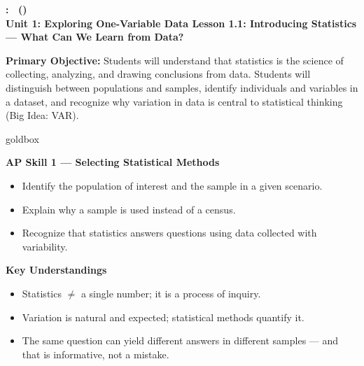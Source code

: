\documentclass[10pt]{article}
\begin{document}
\def\UnitNumberName{Unit 1: Exploring One-Variable Data \quad}
\def\LessonNumberName{Lesson 1.1: Introducing Statistics --- What Can We Learn from Data?}

\begin{center}
    {\Large\bfseries \CourseName: \SchoolYear\ (\MeetingLength) \\
    {\small\bfseries \UnitNumberName \LessonNumberName}}
\end{center}

\begin{tcolorbox}[colback=sky, colframe=navy, boxrule=0.9pt, arc=2mm,
    left=2mm, right=2mm, top=1.5mm, bottom=1.5mm]
    \textbf{Primary Objective:} Students will understand that statistics is the science of
    collecting, analyzing, and drawing conclusions from data. Students will distinguish between
    populations and samples, identify individuals and variables in a dataset, and recognize why
    variation in data is central to statistical thinking (Big Idea: VAR).
\end{tcolorbox}

\renewcommand{\arraystretch}{1.6}
\begin{skillbox}{goldbox}
\begin{minipage}[t]{0.48\linewidth}
    \textbf{AP Skill 1 --- Selecting Statistical Methods}
    \begin{itemize}
        \item Identify the population of interest and the sample in a given scenario.
        \item Explain why a sample is used instead of a census.
        \item Recognize that statistics answers questions using data collected with variability.
    \end{itemize}
\end{minipage}
\hfill
\begin{minipage}[t]{0.48\linewidth}
    \textbf{Key Understandings}
    \begin{itemize}
        \item Statistics $\neq$ a single number; it is a process of inquiry.
        \item Variation is natural and expected; statistical methods quantify it.
        \item The same question can yield different answers in different samples --- and that is informative, not a mistake.
    \end{itemize}
\end{minipage}
\end{skillbox}
\end{document}

